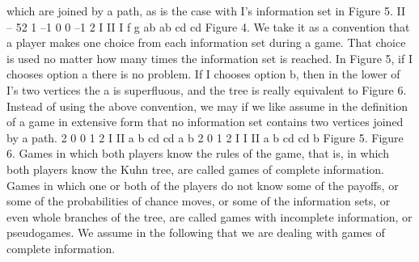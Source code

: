 \documentclass[]{report}
\begin{document}
which are joined by a path, as is the case with I’s information set in Figure 5.
II – 52
1
–1 0 0 –1
2
I
II
I
f g
ab ab
cd cd
Figure 4.
We take it as a convention that a player makes one choice from each information set
during a game. That choice is used no matter how many times the information set is
reached. In Figure 5, if I chooses option a there is no problem. If I chooses option b, then
in the lower of I’s two vertices the a is superfluous, and the tree is really equivalent to
Figure 6. Instead of using the above convention, we may if we like assume in the definition
of a game in extensive form that no information set contains two vertices joined by a path.
2 0
0 1
2
I
II
a b
cd cd
a b
2 0
1
2
I
I
II
a b
cd cd
b
Figure 5. Figure 6.
Games in which both players know the rules of the game, that is, in which both players
know the Kuhn tree, are called games of complete information. Games in which one or
both of the players do not know some of the payoffs, or some of the probabilities of chance
moves, or some of the information sets, or even whole branches of the tree, are called
games with incomplete information, or pseudogames. We assume in the following
that we are dealing with games of complete information.
\end{document}
